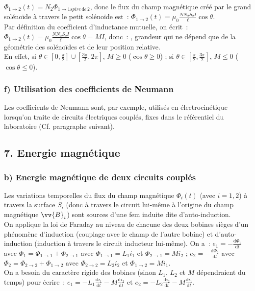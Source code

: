 \documentclass{article}
\renewcommand\overrightarrow{\vv}
\begin{document}
\begin{itemize}
$\Phi_{1\longrightarrow 2}(t) = N_{2}\Phi_{1\longrightarrow 1
spire\, \mathrm{d}e\,2}$, donc le flux du champ magnétique créé par le grand
solénoïde à travers le petit solénoïde est : $\Phi_{1\longrightarrow 2}(t) = \mu_{0}\frac{NN_{2}S_{2}I}{\ell}\cos\theta$.\\
Par définition du coefficient d'inductance mutuelle, on écrit :
$\Phi_{1\longrightarrow 2}(t)
=\mu_{0}\frac{NN_{2}S_{2}I}{\ell}\cos\theta = MI$, donc : , grandeur qui ne dépend
que de la géométrie des solénoïdes et de leur position
relative. \\
En effet, si $\theta \in \left[0,\frac{\pi}{2}\right] \cup
\left[\frac{3\pi}{2},2\pi\right]$, $M\geq 0$ ($\cos\theta \geq 0$) ; si $\theta
\in \left[\frac{\pi}{2},\frac{3\pi}{2}\right]$, $M\leq 0$ ($\cos\theta \leq
0$).
\end{itemize}

\subsubsection*{f) Utilisation des coefficients de Neumann}
Les coefficients de Neumann sont, par exemple, utilisés en
électrocinétique lorsqu'on traite de circuits électriques couplés,
fixes dans le référentiel du laboratoire (Cf. paragraphe suivant).

\subsection*{7. Energie magnétique}
\subsubsection*{b) Energie magnétique de deux circuits couplés}
Les variations temporelles du flux du champ magnétique
$\Phi_{i}(t)$ (avec $i=1,2$) à travers la surface $S_{i}$ (donc à
travers le circuit lui-même à l'origine du champ magnétique
$\overrightarrow{B}_{i}$) sont sources d'une fem induite dite
d'auto-induction. \\
On applique la loi de Faraday au niveau de chacune des deux bobines
sièges d'un phénomène d'induction (couplage avec le champ de l'autre
bobine) et d'auto-induction (induction à travers le circuit
inducteur lui-même). On a : $e_{1} = -\frac{\mathrm{d}\Phi_{1}}{\mathrm{d}t}$ avec
$\Phi_{1} = \Phi_{1 \rightarrow 1}+ \Phi_{2 \rightarrow 1}$ avec
$\Phi_{1 \rightarrow 1} = L_{1}i_{1}$ et $\Phi_{2 \rightarrow 1} =
Mi_{2}$ ; $e_{2} = -\frac{\mathrm{d}\Phi_{2}}{\mathrm{d}t}$ avec $\Phi_{2} = \Phi_{2
\rightarrow 2}+ \Phi_{1 \rightarrow 2}$ avec $\Phi_{2 \rightarrow 2}
= L_{2}i_{2}$ et $\Phi_{1 \rightarrow 2} = Mi_{1}$.
\\
On a besoin du caractère rigide des bobines (sinon $L_{1}$, $L_{2}$
et $M$ dépendraient du temps) pour écrire : $e_{1} =
-L_{1}\frac{\mathrm{d}i_{1}}{\mathrm{d}t}-M\frac{\mathrm{d}i_{2}}{\mathrm{d}t}$ et $e_{2} =
-L_{2}\frac{\mathrm{d}i_{2}}{\mathrm{d}t}-M\frac{\mathrm{d}i_{1}}{\mathrm{d}t}$. \\
\end{document}
